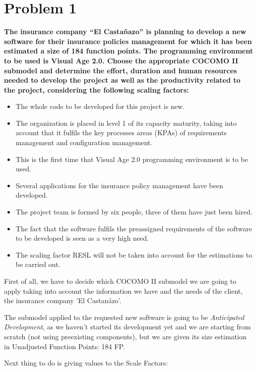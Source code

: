 \section{Problem 1}

\textbf{The insurance company “El Castañazo” is planning to develop a new software for their insurance policies management for which it has been estimated a size of 184 function points.
The programming environment to be used is Visual Age 2.0. Choose the appropriate COCOMO II submodel and determine the effort, duration and human resources needed to develop the project as well as the productivity related to the project, considering the following scaling factors:}

\begin{itemize}
\item The whole code to be developed for this project is new.
\item The organization is placed in level 1 of its capacity maturity, taking into account that it fulfils the key processes areas (KPAs) of requirements
management and configuration management.
\item This is the first time that Visual Age 2.0 programming environment is to be used.
\item Several applications for the insurance policy management have been developed.
\item The project team is formed by six people, three of them have just been hired.
\item The fact that the software fulfils the preassigned requirements of the software to be developed is seen as a very high need.
\item The scaling factor RESL will not be taken into account for the estimations to be carried out.
\end{itemize}


\seprule 

First of all, we have to decide which COCOMO II submodel we are going to apply taking into account the information we have and the needs of the client, the insurance company 'El Castan\'azo'. 

The submodel applied to the requested new software is going to be \emph{Anticipated Development}, as we haven't started its development yet and we are starting from scratch (not using preexisting components), but we are given its size estimation in Unadjusted Function Points: 184 FP.

Next thing to do is giving values to the Scale Factors:

